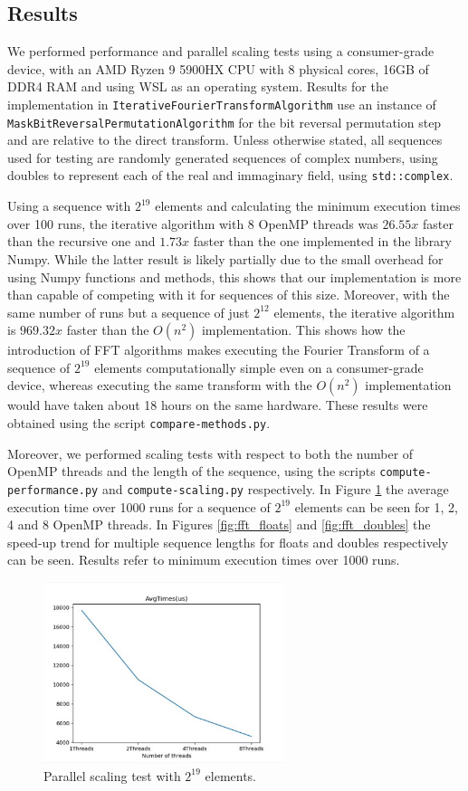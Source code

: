 \subsection{Results}
We performed performance and parallel scaling tests using a consumer-grade device, with an AMD Ryzen 9 5900HX CPU with 8 physical cores, 16GB of DDR4 RAM and using WSL as an operating system. Results for the implementation in \texttt{Iterative\-Fourier\-Transform\-Algorithm} use an instance of \texttt{Mask\-Bit\-Reversal\-Permutation\-Algorithm} for the bit reversal permutation step and are relative to the direct transform. Unless otherwise stated, all sequences used for testing are randomly generated sequences of complex numbers, using doubles to represent each of the real and immaginary field, using \texttt{std::complex}. 

Using a sequence with $2^{19}$ elements and calculating the minimum execution times over 100 runs, the iterative algorithm with 8 OpenMP threads was $26.55x$ faster than the recursive one and $1.73x$ faster than the one implemented in the library Numpy. While the latter result is likely partially due to the small overhead for using Numpy functions and methods, this shows that our implementation is more than capable of competing with it for sequences of this size. Moreover, with the same number of runs but a sequence of just $2^{12}$ elements, the iterative algorithm is $969.32x$ faster than the $O(n^2)$ implementation. This shows how the introduction of FFT algorithms makes executing the Fourier Transform of a sequence of $2^{19}$ elements computationally simple even on a consumer-grade device, whereas executing the same transform with the $O(n^2)$ implementation would have taken about 18 hours on the same hardware. These results were obtained using the script \texttt{compare-methods.py}.

Moreover, we performed scaling tests with respect to both the number of OpenMP threads and the length of the sequence, using the scripts \texttt{compute\--performance.py} and \texttt{compute\--scaling.py} respectively. In Figure \ref{fig:fft_threads} the average execution time over 1000 runs for a sequence of $2^{19}$ elements can be seen for 1, 2, 4 and 8 OpenMP threads. In Figures \ref{fig:fft_floats} and \ref{fig:fft_doubles} the speed-up trend for multiple sequence lengths for floats and doubles respectively can be seen. Results refer to minimum execution times over 1000 runs.

\begin{figure}[ht]
    \centering
    \includegraphics[width=70mm]{image/fft_times}
    \caption{Parallel scaling test with $2^{19}$ elements.}
    \label{fig:fft_threads}
\end{figure}


